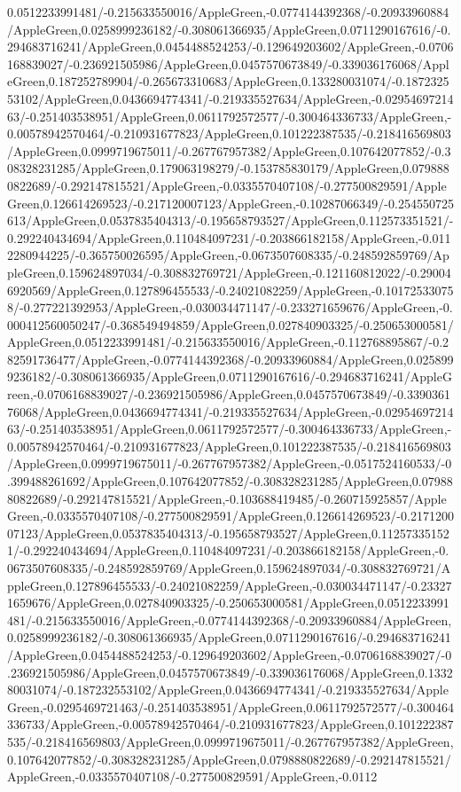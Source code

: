 {\begin{tikzternal}
{0.0512233991481/-0.215633550016/AppleGreen,-0.0774144392368/-0.20933960884/AppleGreen,0.0258999236182/-0.308061366935/AppleGreen,0.0711290167616/-0.294683716241/AppleGreen,0.0454488524253/-0.129649203602/AppleGreen,-0.0706168839027/-0.236921505986/AppleGreen,0.0457570673849/-0.339036176068/AppleGreen,0.187252789904/-0.265673310683/AppleGreen,0.133280031074/-0.187232553102/AppleGreen,0.0436694774341/-0.219335527634/AppleGreen,-0.0295469721463/-0.251403538951/AppleGreen,0.0611792572577/-0.300464336733/AppleGreen,-0.00578942570464/-0.210931677823/AppleGreen,0.101222387535/-0.218416569803/AppleGreen,0.0999719675011/-0.267767957382/AppleGreen,0.107642077852/-0.308328231285/AppleGreen,0.179063198279/-0.153785830179/AppleGreen,0.0798880822689/-0.292147815521/AppleGreen,-0.0335570407108/-0.277500829591/AppleGreen,0.126614269523/-0.217120007123/AppleGreen,-0.10287066349/-0.254550725613/AppleGreen,0.0537835404313/-0.195658793527/AppleGreen,0.112573351521/-0.292240434694/AppleGreen,0.110484097231/-0.203866182158/AppleGreen,-0.0112280944225/-0.365750026595/AppleGreen,-0.0673507608335/-0.248592859769/AppleGreen,0.159624897034/-0.308832769721/AppleGreen,-0.121160812022/-0.290046920569/AppleGreen,0.127896455533/-0.24021082259/AppleGreen,-0.101725330758/-0.277221392953/AppleGreen,-0.030034471147/-0.233271659676/AppleGreen,-0.000412560050247/-0.368549494859/AppleGreen,0.027840903325/-0.250653000581/AppleGreen,0.0512233991481/-0.215633550016/AppleGreen,-0.112768895867/-0.282591736477/AppleGreen,-0.0774144392368/-0.20933960884/AppleGreen,0.0258999236182/-0.308061366935/AppleGreen,0.0711290167616/-0.294683716241/AppleGreen,-0.0706168839027/-0.236921505986/AppleGreen,0.0457570673849/-0.339036176068/AppleGreen,0.0436694774341/-0.219335527634/AppleGreen,-0.0295469721463/-0.251403538951/AppleGreen,0.0611792572577/-0.300464336733/AppleGreen,-0.00578942570464/-0.210931677823/AppleGreen,0.101222387535/-0.218416569803/AppleGreen,0.0999719675011/-0.267767957382/AppleGreen,-0.0517524160533/-0.399488261692/AppleGreen,0.107642077852/-0.308328231285/AppleGreen,0.0798880822689/-0.292147815521/AppleGreen,-0.103688419485/-0.260715925857/AppleGreen,-0.0335570407108/-0.277500829591/AppleGreen,0.126614269523/-0.217120007123/AppleGreen,0.0537835404313/-0.195658793527/AppleGreen,0.112573351521/-0.292240434694/AppleGreen,0.110484097231/-0.203866182158/AppleGreen,-0.0673507608335/-0.248592859769/AppleGreen,0.159624897034/-0.308832769721/AppleGreen,0.127896455533/-0.24021082259/AppleGreen,-0.030034471147/-0.233271659676/AppleGreen,0.027840903325/-0.250653000581/AppleGreen,0.0512233991481/-0.215633550016/AppleGreen,-0.0774144392368/-0.20933960884/AppleGreen,0.0258999236182/-0.308061366935/AppleGreen,0.0711290167616/-0.294683716241/AppleGreen,0.0454488524253/-0.129649203602/AppleGreen,-0.0706168839027/-0.236921505986/AppleGreen,0.0457570673849/-0.339036176068/AppleGreen,0.133280031074/-0.187232553102/AppleGreen,0.0436694774341/-0.219335527634/AppleGreen,-0.0295469721463/-0.251403538951/AppleGreen,0.0611792572577/-0.300464336733/AppleGreen,-0.00578942570464/-0.210931677823/AppleGreen,0.101222387535/-0.218416569803/AppleGreen,0.0999719675011/-0.267767957382/AppleGreen,0.107642077852/-0.308328231285/AppleGreen,0.0798880822689/-0.292147815521/AppleGreen,-0.0335570407108/-0.277500829591/AppleGreen,-0.0112}
\end{tikzternal}}
